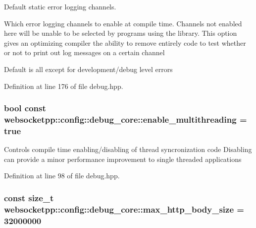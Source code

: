 Default static error logging channels. 

Which error logging channels to enable at compile time. Channels not enabled here will be unable to be selected by programs using the library. This option gives an optimizing compiler the ability to remove entirely code to test whether or not to print out log messages on a certain channel

Default is all except for development/debug level errors 

Definition at line 176 of file debug.\+hpp.

\subsubsection[{\texorpdfstring{enable\+\_\+multithreading}{enable\_multithreading}}]{\setlength{\rightskip}{0pt plus 5cm}bool const websocketpp\+::config\+::debug\+\_\+core\+::enable\+\_\+multithreading = true\hspace{0.3cm}{\ttfamily [static]}}\hypertarget{structwebsocketpp_1_1config_1_1debug__core_acbf3aa1de5fc4dacbdb7866375791409}{}\label{structwebsocketpp_1_1config_1_1debug__core_acbf3aa1de5fc4dacbdb7866375791409}
Controls compile time enabling/disabling of thread syncronization code Disabling can provide a minor performance improvement to single threaded applications 

Definition at line 98 of file debug.\+hpp.

\subsubsection[{\texorpdfstring{max\+\_\+http\+\_\+body\+\_\+size}{max\_http\_body\_size}}]{\setlength{\rightskip}{0pt plus 5cm}const size\+\_\+t websocketpp\+::config\+::debug\+\_\+core\+::max\+\_\+http\+\_\+body\+\_\+size = 32000000\hspace{0.3cm}{\ttfamily [static]}}\hypertarget{structwebsocketpp_1_1config_1_1debug__core_a95ea7d50bc0617bc447d98dca1ea7e0d}{}\label{structwebsocketpp_1_1config_1_1debug__core_a95ea7d50bc0617bc447d98dca1ea7e0d}


